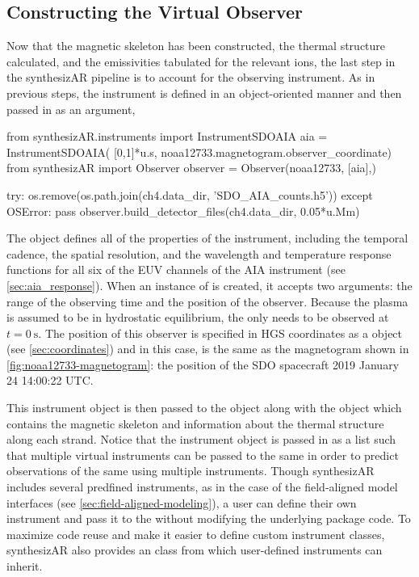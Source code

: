 \subsection{Constructing the Virtual Observer}

Now that the magnetic skeleton has been constructed, the thermal structure calculated, and the emissivities tabulated for the relevant ions, the last step in the synthesizAR pipeline is to account for the observing instrument. As in previous steps, the instrument is defined in an object-oriented manner and then passed in as an argument,
\begin{pyblock}[chapter4][baselinestretch=1,xleftmargin=3em]
from synthesizAR.instruments import InstrumentSDOAIA
aia = InstrumentSDOAIA(
    [0,1]*u.s, noaa12733.magnetogram.observer_coordinate)
from synthesizAR import Observer
observer = Observer(noaa12733, [aia],)
\end{pyblock}
\begin{pycode}[chapter4]
try:
    os.remove(os.path.join(ch4.data_dir, 'SDO_AIA_counts.h5'))
except OSError:
    pass
observer.build_detector_files(ch4.data_dir, 0.05*u.Mm)
\end{pycode}
The  object defines all of the properties of the instrument, including the temporal cadence, the spatial resolution, and the wavelength and temperature response functions for all six of the EUV channels of the AIA instrument (see \autoref{sec:aia_response}). When an instance of  is created, it accepts two arguments: the range of the observing time and the position of the observer. Because the plasma is assumed to be in hydrostatic equilibrium, the \AR{} only needs to be observed at $t=\SI{0}{\second}$. The position of this observer is specified in HGS coordinates as a  object (see \autoref{sec:coordinates}) and in this case, is the same as the magnetogram shown in \autoref{fig:noaa12733-magnetogram}: the position of the SDO spacecraft 2019 January 24 14:00:22 UTC.

This instrument object is then passed to the  object along with the  object which contains the magnetic skeleton and information about the thermal structure along each strand. Notice that the instrument object is passed in as a list such that multiple virtual instruments can be passed to the same  in order to predict observations of the same \AR{} using multiple instruments. Though synthesizAR includes several predfined instruments, as in the case of the field-aligned model interfaces (see \autoref{sec:field-aligned-modeling}), a user can define their own instrument and pass it to the  without modifying the underlying package code. To maximize code reuse and make it easier to define custom instrument classes, synthesizAR also provides an  class from which user-defined instruments can inherit.

